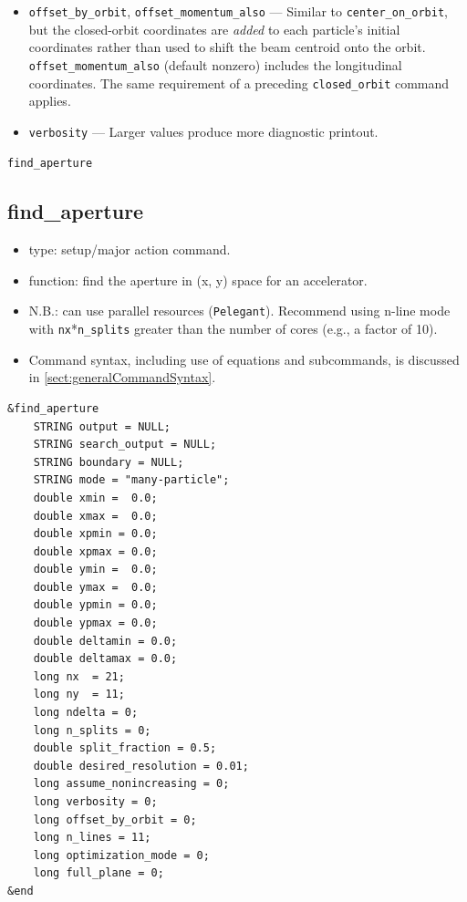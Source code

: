 \documentclass[11pt]{article}
\begin{document}
\begin{itemize}
  a large betatron transient about the closed orbit at the start of the run.  When
  \verb|center_momentum_also| is nonzero (the default) the longitudinal coordinates are
  centered as well.  This works exactly as in the \verb|track| command, and, as there, it
  takes effect \emph{only} when a \verb|closed_orbit| command precedes the
  \verb|fast_orbit_feedback| command so that the closed orbit is actually computed;
  \verb|fast_orbit_feedback| never computes the closed orbit on its own.  If requested
  without a preceding \verb|closed_orbit| command, a warning is issued and the beam is not
  centered.
\item \verb|offset_by_orbit|, \verb|offset_momentum_also| --- Similar to
  \verb|center_on_orbit|, but the closed-orbit coordinates are \emph{added} to each
  particle's initial coordinates rather than used to shift the beam centroid onto the orbit.
  \verb|offset_momentum_also| (default nonzero) includes the longitudinal coordinates.  The
  same requirement of a preceding \verb|closed_orbit| command applies.
\item \verb|verbosity| --- Larger values produce more diagnostic printout.
\end{itemize}

\newpage
\begin{center}{\Large\verb|find_aperture|}\end{center}
\subsection{find\_aperture \label{subsec:findaperture}}

\begin{itemize}
\item type: setup/major action command.
\item function: find the aperture in (x, y) space for an accelerator.
\item N.B.: can use parallel resources (\verb|Pelegant|). Recommend using n-line mode with \verb|nx|*\verb|n_splits|
  greater than the number of cores (e.g., a factor of 10).
\item Command syntax, including use of equations and subcommands, is discussed in \ref{sect:generalCommandSyntax}.
\end{itemize}

\begin{verbatim}
&find_aperture
    STRING output = NULL;
    STRING search_output = NULL;
    STRING boundary = NULL;
    STRING mode = "many-particle";
    double xmin =  0.0;
    double xmax =  0.0;
    double xpmin = 0.0;
    double xpmax = 0.0;
    double ymin =  0.0;
    double ymax =  0.0;
    double ypmin = 0.0;
    double ypmax = 0.0;
    double deltamin = 0.0;
    double deltamax = 0.0;
    long nx  = 21;
    long ny  = 11;
    long ndelta = 0;
    long n_splits = 0;
    double split_fraction = 0.5;
    double desired_resolution = 0.01;
    long assume_nonincreasing = 0;
    long verbosity = 0;    
    long offset_by_orbit = 0;
    long n_lines = 11;
    long optimization_mode = 0;
    long full_plane = 0;
&end
\end{verbatim}
\end{document}
